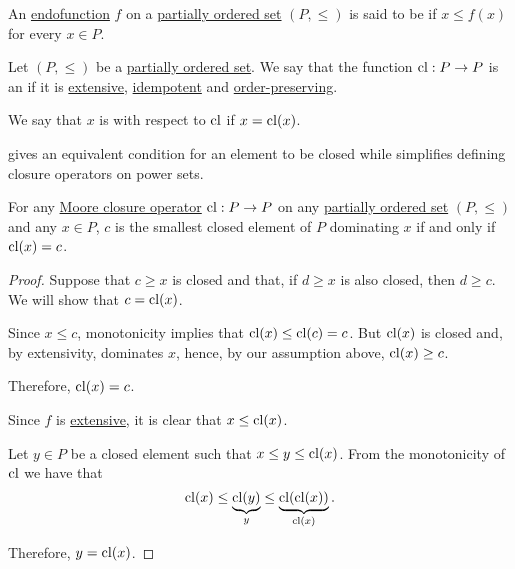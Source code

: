 \begin{definition}\label{def:extensive_function}
  An \hyperref[def:function/endofunction]{endofunction} \( f \) on a \hyperref[def:partially_ordered_set]{partially ordered set} \( (P, \leq) \) is said to be  if \( x \leq f(x) \) for every \( x \in P \).
\end{definition}

\begin{definition}\label{def:moore_closure_operator}
  Let \( (P, \leq) \) be a \hyperref[def:partially_ordered_set]{partially ordered set}. We say that the function \( \operatorname{cl}: P \to P \) is an  if it is \hyperref[def:extensive_function]{extensive}, \hyperref[def:binary_operation/idempotent]{idempotent} and \hyperref[def:order_homomorphism/increasing]{order-preserving}.

  We say that \( x \) is  with respect to \( \operatorname{cl} \) if \( x = \operatorname{cl}(x) \).
\end{definition}
\begin{comments}
  \item {} gives an equivalent condition for an element to be closed while  simplifies defining closure operators on power sets.
\end{comments}

\begin{proposition}\label{thm:closure_operator_minimality}
  For any \hyperref[def:moore_closure_operator]{Moore closure operator} \( \operatorname{cl}: P \to P \) on any \hyperref[def:partially_ordered_set]{partially ordered set} \( (P, \leq) \) and any \( x \in P \), \( c \) is the smallest closed element of \( P \) dominating \( x \) if and only if \( \operatorname{cl}(x) = c \).
\end{proposition}
\begin{proof}
  \SufficiencySubProof Suppose that \( c \geq x \) is closed and that, if \( d \geq x \) is also closed, then \( d \geq c \). We will show that \( c = \operatorname{cl}(x) \).

  Since \( x \leq c \), monotonicity implies that \( \operatorname{cl}(x) \leq \operatorname{cl}(c) = c \). But \( \operatorname{cl}(x) \) is closed and, by extensivity, dominates \( x \), hence, by our assumption above, \( \operatorname{cl}(x) \geq c \).

  Therefore, \( \operatorname{cl}(x) = c \).

  \NecessitySubProof Since \( f \) is \hyperref[def:extensive_function]{extensive}, it is clear that \( x \leq \operatorname{cl}(x) \).

  Let \( y \in P \) be a closed element such that \( x \leq y \leq \operatorname{cl}(x) \). From the monotonicity of \( \operatorname{cl} \) we have that
  \begin{equation*}
    \operatorname{cl}(x) \leq \underbrace{\operatorname{cl}(y)}_{y} \leq \underbrace{\operatorname{cl}(\operatorname{cl}(x))}_{\operatorname{cl}(x)}.
  \end{equation*}

  Therefore, \( y = \operatorname{cl}(x) \).
\end{proof}

